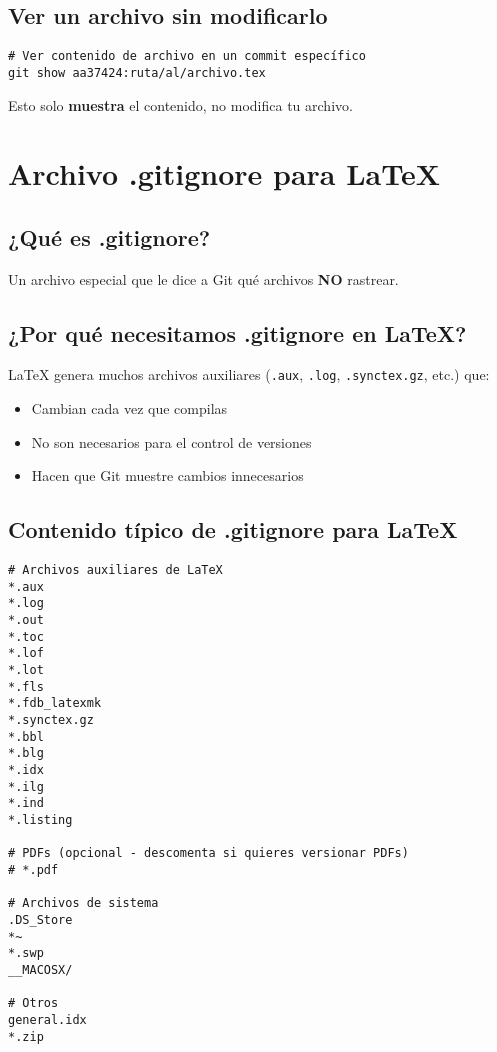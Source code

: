 \documentclass[12pt,a4paper]{article}
\begin{document}
\subsection{Ver un archivo sin modificarlo}

\begin{lstlisting}[style=bashstyle]
# Ver contenido de archivo en un commit específico
git show aa37424:ruta/al/archivo.tex
\end{lstlisting}

Esto solo \textbf{muestra} el contenido, no modifica tu archivo.

\section{Archivo .gitignore para LaTeX}

\subsection{¿Qué es .gitignore?}

Un archivo especial que le dice a Git qué archivos \textbf{NO} rastrear.

\subsection{¿Por qué necesitamos .gitignore en LaTeX?}

LaTeX genera muchos archivos auxiliares (\texttt{.aux}, \texttt{.log}, \texttt{.synctex.gz}, etc.) que:
\begin{itemize}
  \item Cambian cada vez que compilas
  \item No son necesarios para el control de versiones
  \item Hacen que Git muestre cambios innecesarios
\end{itemize}

\subsection{Contenido típico de .gitignore para LaTeX}

\begin{lstlisting}[style=bashstyle]
# Archivos auxiliares de LaTeX
*.aux
*.log
*.out
*.toc
*.lof
*.lot
*.fls
*.fdb_latexmk
*.synctex.gz
*.bbl
*.blg
*.idx
*.ilg
*.ind
*.listing

# PDFs (opcional - descomenta si quieres versionar PDFs)
# *.pdf

# Archivos de sistema
.DS_Store
*~
*.swp
__MACOSX/

# Otros
general.idx
*.zip
\end{lstlisting}
\end{document}
